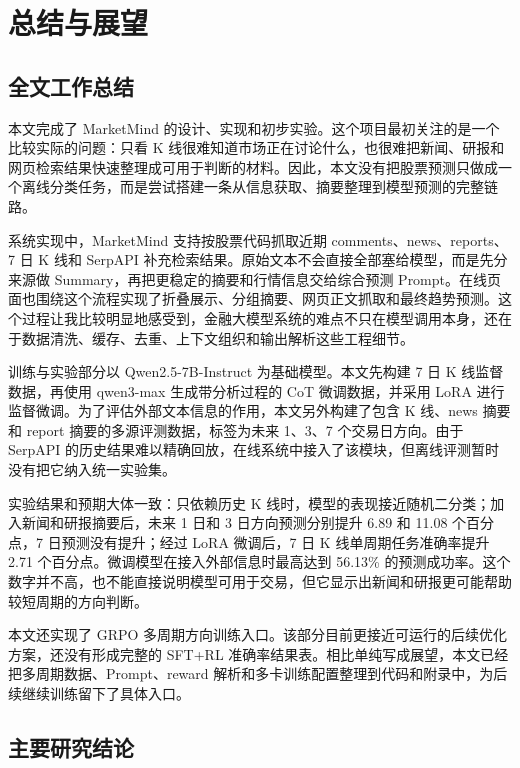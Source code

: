 
\chapter{总结与展望}

\section{全文工作总结}

本文完成了 MarketMind 的设计、实现和初步实验。这个项目最初关注的是一个比较实际的问题：只看 K 线很难知道市场正在讨论什么，也很难把新闻、研报和网页检索结果快速整理成可用于判断的材料。因此，本文没有把股票预测只做成一个离线分类任务，而是尝试搭建一条从信息获取、摘要整理到模型预测的完整链路。

系统实现中，MarketMind 支持按股票代码抓取近期 comments、news、reports、7 日 K 线和 SerpAPI 补充检索结果。原始文本不会直接全部塞给模型，而是先分来源做 Summary，再把更稳定的摘要和行情信息交给综合预测 Prompt。在线页面也围绕这个流程实现了折叠展示、分组摘要、网页正文抓取和最终趋势预测。这个过程让我比较明显地感受到，金融大模型系统的难点不只在模型调用本身，还在于数据清洗、缓存、去重、上下文组织和输出解析这些工程细节。

训练与实验部分以 Qwen2.5-7B-Instruct 为基础模型。本文先构建 7 日 K 线监督数据，再使用 qwen3-max 生成带分析过程的 CoT 微调数据，并采用 LoRA 进行监督微调。为了评估外部文本信息的作用，本文另外构建了包含 K 线、news 摘要和 report 摘要的多源评测数据，标签为未来 1、3、7 个交易日方向。由于 SerpAPI 的历史结果难以精确回放，在线系统中接入了该模块，但离线评测暂时没有把它纳入统一实验集。

实验结果和预期大体一致：只依赖历史 K 线时，模型的表现接近随机二分类；加入新闻和研报摘要后，未来 1 日和 3 日方向预测分别提升 6.89 和 11.08 个百分点，7 日预测没有提升；经过 LoRA 微调后，7 日 K 线单周期任务准确率提升 2.71 个百分点。微调模型在接入外部信息时最高达到 56.13\% 的预测成功率。这个数字并不高，也不能直接说明模型可用于交易，但它显示出新闻和研报更可能帮助较短周期的方向判断。

本文还实现了 GRPO 多周期方向训练入口。该部分目前更接近可运行的后续优化方案，还没有形成完整的 SFT+RL 准确率结果表。相比单纯写成展望，本文已经把多周期数据、Prompt、reward 解析和多卡训练配置整理到代码和附录中，为后续继续训练留下了具体入口。

\section{主要研究结论}

